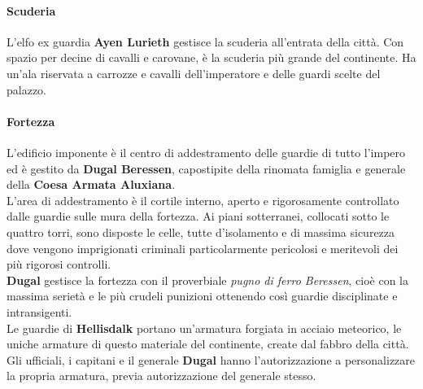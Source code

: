 \documentclass[10pt,twoside,onecolumn,openany]{book}
\begin{document}
\paragraph{Scuderia}
L'elfo ex guardia \textbf{Ayen Lurieth} gestisce la scuderia all'entrata della città. Con spazio per decine di cavalli e carovane, è la scuderia più grande del continente. Ha un'ala riservata a carrozze e cavalli dell'imperatore e delle guardi scelte del palazzo.
\paragraph{Fortezza}
L'edificio imponente è il centro di addestramento delle guardie di tutto l'impero ed è gestito da \textbf{Dugal Beressen}, capostipite della rinomata famiglia e generale della \textbf{Coesa Armata Aluxiana}.\\
L'area di addestramento è il cortile interno, aperto e rigorosamente controllato dalle guardie sulle mura della fortezza. Ai piani sotterranei, collocati sotto le quattro torri, sono disposte le celle, tutte d'isolamento e di massima sicurezza dove vengono imprigionati criminali particolarmente pericolosi e meritevoli dei più rigorosi controlli.\\
\textbf{Dugal} gestisce la fortezza con il proverbiale \textit{pugno di ferro Beressen}, cioè con la massima serietà e le più crudeli punizioni ottenendo così guardie disciplinate e intransigenti.\\
Le guardie di \textbf{Hellisdalk} portano un'armatura forgiata in acciaio meteorico, le uniche armature di questo materiale del continente, create dal fabbro della città. Gli ufficiali, i capitani e il generale \textbf{Dugal} hanno l'autorizzazione a personalizzare la propria armatura, previa autorizzazione del generale stesso.
\end{document}
